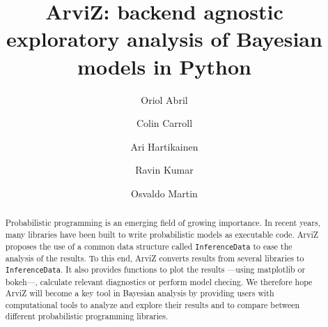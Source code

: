 \documentclass[anonymous=false, %
               format=acmsmall, %
               review=true, %
               screen=true, %
               nonacm=true]{acmart}
\begin{document}
\title{{ArviZ}: backend agnostic exploratory analysis of
{Bayesian} models in {Python}}

\author{Oriol Abril}

\author{Colin Carroll}

\author{Ari Hartikainen}

\author{Ravin Kumar}

\author{Osvaldo Martin}

\begin{abstract}
  Probabilistic programming is an emerging field of growing importance. In
  recent years, many libraries have been built to write probabilistic models
  as executable code. ArviZ proposes the use of a common data structure called
  \texttt{InferenceData} to ease the analysis of the results. To this end,
  ArviZ converts results from several libraries to
  \texttt{InferenceData}. It also provides functions to plot the results ---using
  matplotlib or bokeh---, calculate relevant diagnostics or perform model checing.
  We therefore hope ArviZ will become a key tool in Bayesian analysis by
  providing users with computational tools to analyze and explore their results and to
  compare between different probabilistic programming libraries.
\end{abstract}

\maketitle
\end{document}
